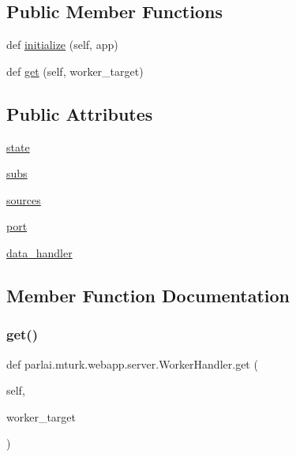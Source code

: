 \subsection*{Public Member Functions}
\begin{DoxyCompactItemize}
\item 
def \hyperlink{classparlai_1_1mturk_1_1webapp_1_1server_1_1WorkerHandler_a6e358648dc6628021fe6384d2741c2cc}{initialize} (self, app)
\item 
def \hyperlink{classparlai_1_1mturk_1_1webapp_1_1server_1_1WorkerHandler_ae2d5a8e9e7a62c96f5dd4b4c7cc3190e}{get} (self, worker\+\_\+target)
\end{DoxyCompactItemize}
\subsection*{Public Attributes}
\begin{DoxyCompactItemize}
\item 
\hyperlink{classparlai_1_1mturk_1_1webapp_1_1server_1_1WorkerHandler_af6f56f70aa5d37190629bb460f76f5bf}{state}
\item 
\hyperlink{classparlai_1_1mturk_1_1webapp_1_1server_1_1WorkerHandler_a688a67d4e6ea07a81ac7b122bd1c2c25}{subs}
\item 
\hyperlink{classparlai_1_1mturk_1_1webapp_1_1server_1_1WorkerHandler_a1ea89751b206df02f704b20ec39458ca}{sources}
\item 
\hyperlink{classparlai_1_1mturk_1_1webapp_1_1server_1_1WorkerHandler_aee8590b08e1a2011424d0145473f849e}{port}
\item 
\hyperlink{classparlai_1_1mturk_1_1webapp_1_1server_1_1WorkerHandler_ab9fd59301ef9d35ba692abdbb8e4b0b8}{data\+\_\+handler}
\end{DoxyCompactItemize}


\subsection{Member Function Documentation}
\mbox{\label{classparlai_1_1mturk_1_1webapp_1_1server_1_1WorkerHandler_ae2d5a8e9e7a62c96f5dd4b4c7cc3190e}} 
\subsubsection{\texorpdfstring{get()}{get()}}
{\footnotesize\ttfamily def parlai.\+mturk.\+webapp.\+server.\+Worker\+Handler.\+get (\begin{DoxyParamCaption}\item[{}]{self,  }\item[{}]{worker\+\_\+target }\end{DoxyParamCaption})}

